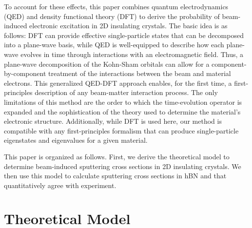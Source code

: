\documentclass[twoside,twocolumn,9pt]{article}
\begin{document}
To account for these effects, this paper combines quantum electrodynamics (QED)
and density functional theory (DFT) to derive the probability of beam-induced
electronic excitation in 2D insulating crystals.
The basic idea is as follows: DFT can provide effective single-particle states
that can be decomposed into a plane-wave basis,\cite{Hohenberg1964, Kohn1965,
Kresse1996a} while QED is well-equipped to describe how each plane-wave
evolves in time through interactions with an electromagnetic
field. \cite{Lourenco-Martins2021, Peskin1995, Lancaster2014}
Thus, a plane-wave decomposition of the Kohn-Sham orbitals can allow for a
component-by-component treatment of the interactions between the beam and
material electrons.
This generalized QED-DFT approach enables, for the first time, a
first-principles description of any beam-matter interaction process.
The only limitations of this method are the order to which the time-evolution
operator is expanded and the sophistication of the theory used to determine the
material's electronic structure.
Additionally, while DFT is used here, our method is compatible with any
first-principles formalism that can produce single-particle eigenstates and
eigenvalues for a given material.

This paper is organized as follows.
First,
we derive the theoretical model to determine beam-induced sputtering cross
sections in 2D insulating crystals.
We then use this model to calculate sputtering cross sections in hBN and
 that quantitatively agree with experiment.

\section{Theoretical Model}
\label{sec:bigPicture}
\end{document}

